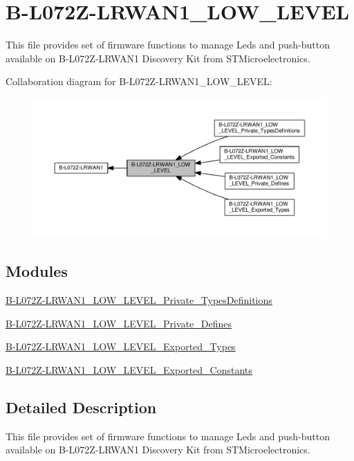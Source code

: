 \hypertarget{group__B-L072Z-LRWAN1__LOW__LEVEL}{}\section{B-\/\+L072\+Z-\/\+L\+R\+W\+A\+N1\+\_\+\+L\+O\+W\+\_\+\+L\+E\+V\+EL}
\label{group__B-L072Z-LRWAN1__LOW__LEVEL}


This file provides set of firmware functions to manage Leds and push-\/button available on B-\/\+L072\+Z-\/\+L\+R\+W\+A\+N1 Discovery Kit from S\+T\+Microelectronics.  


Collaboration diagram for B-\/\+L072\+Z-\/\+L\+R\+W\+A\+N1\+\_\+\+L\+O\+W\+\_\+\+L\+E\+V\+EL\+:
\nopagebreak
\begin{figure}[H]
\begin{center}
\leavevmode
\includegraphics[width=350pt]{group__B-L072Z-LRWAN1__LOW__LEVEL}
\end{center}
\end{figure}
\subsection*{Modules}
\begin{DoxyCompactItemize}
\item 
\hyperlink{group__B-L072Z-LRWAN1__LOW__LEVEL__Private__TypesDefinitions}{B-\/\+L072\+Z-\/\+L\+R\+W\+A\+N1\+\_\+\+L\+O\+W\+\_\+\+L\+E\+V\+E\+L\+\_\+\+Private\+\_\+\+Types\+Definitions}
\item 
\hyperlink{group__B-L072Z-LRWAN1__LOW__LEVEL__Private__Defines}{B-\/\+L072\+Z-\/\+L\+R\+W\+A\+N1\+\_\+\+L\+O\+W\+\_\+\+L\+E\+V\+E\+L\+\_\+\+Private\+\_\+\+Defines}
\item 
\hyperlink{group__B-L072Z-LRWAN1__LOW__LEVEL__Exported__Types}{B-\/\+L072\+Z-\/\+L\+R\+W\+A\+N1\+\_\+\+L\+O\+W\+\_\+\+L\+E\+V\+E\+L\+\_\+\+Exported\+\_\+\+Types}
\item 
\hyperlink{group__B-L072Z-LRWAN1__LOW__LEVEL__Exported__Constants}{B-\/\+L072\+Z-\/\+L\+R\+W\+A\+N1\+\_\+\+L\+O\+W\+\_\+\+L\+E\+V\+E\+L\+\_\+\+Exported\+\_\+\+Constants}
\end{DoxyCompactItemize}


\subsection{Detailed Description}
This file provides set of firmware functions to manage Leds and push-\/button available on B-\/\+L072\+Z-\/\+L\+R\+W\+A\+N1 Discovery Kit from S\+T\+Microelectronics. 

